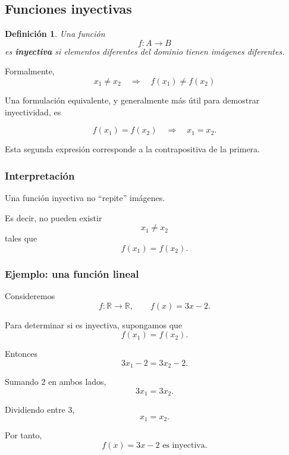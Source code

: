 \documentclass[12pt]{article}
\newtheorem{definicion}{Definición}[section]
\theoremstyle{remark}
\begin{document}
\subsection{Funciones inyectivas}

\begin{definicion}
Una función
\[
f:A\longrightarrow B
\]
es \textbf{inyectiva} si elementos diferentes del dominio tienen
imágenes diferentes.
\end{definicion}

Formalmente,
\[
\boxed{
x_1\neq x_2
\quad\Longrightarrow\quad
f(x_1)\neq f(x_2)
}
\]

Una formulación equivalente, y generalmente más útil para demostrar
inyectividad, es

\[
\boxed{
f(x_1)=f(x_2)
\quad\Longrightarrow\quad
x_1=x_2.
}
\]

Esta segunda expresión corresponde a la contrapositiva de la primera.

\subsubsection{Interpretación}

Una función inyectiva no ``repite'' imágenes.

Es decir, no pueden existir
\[
x_1\neq x_2
\]
tales que
\[
f(x_1)=f(x_2).
\]

\subsubsection{Ejemplo: una función lineal}

Consideremos
\[
f:\mathbb{R}\longrightarrow\mathbb{R},
\qquad
f(x)=3x-2.
\]

Para determinar si es inyectiva, supongamos que
\[
f(x_1)=f(x_2).
\]

Entonces
\[
3x_1-2=3x_2-2.
\]

Sumando \(2\) en ambos lados,
\[
3x_1=3x_2.
\]

Dividiendo entre \(3\),
\[
x_1=x_2.
\]

Por tanto,
\[
\boxed{f(x)=3x-2\text{ es inyectiva}.}
\]

\end{document}
